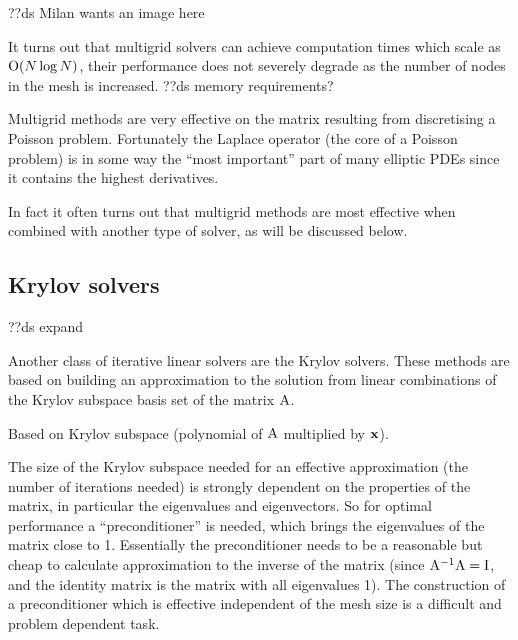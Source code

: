 ??ds Milan wants an image here

It turns out that multigrid solvers can achieve computation times which scale as $\mathrm{O}{\left( N \log N \right)}$, \ie their performance does not severely degrade as the number of nodes in the mesh is increased.
??ds memory requirements?

Multigrid methods are very effective on the matrix resulting from discretising a Poisson problem.
Fortunately the Laplace operator (\ie the core of a Poisson problem) is in some way the ``most important'' part of many elliptic PDEs since it contains the highest derivatives.

In fact it often turns out that multigrid methods are most effective when combined with another type of solver, as will be discussed below.


\subsection{Krylov solvers}
\label{sec:krylov-solvers}

??ds expand

Another class of iterative linear solvers are the Krylov solvers.
These methods are based on building an approximation to the solution from linear combinations of the Krylov subspace basis set of the matrix $\mathrm{A}$.

Based on Krylov subspace (polynomial of $\mathrm{A}$ multiplied by $\boldsymbol{\mathrm{x}}$).

The size of the Krylov subspace needed for an effective approximation (\ie the number of iterations needed) is strongly dependent on the properties of the matrix, in particular the eigenvalues and eigenvectors.
So for optimal performance a ``preconditioner'' is needed, which brings the eigenvalues of the matrix close to 1.
Essentially the preconditioner needs to be a reasonable but cheap to calculate approximation to the inverse of the matrix (since $\mathrm{A}^{-1}\mathrm{A} = \mathrm{I}$, and the identity matrix is the matrix with all eigenvalues 1).
The construction of a preconditioner which is effective independent of the mesh size is a difficult and problem dependent task.


